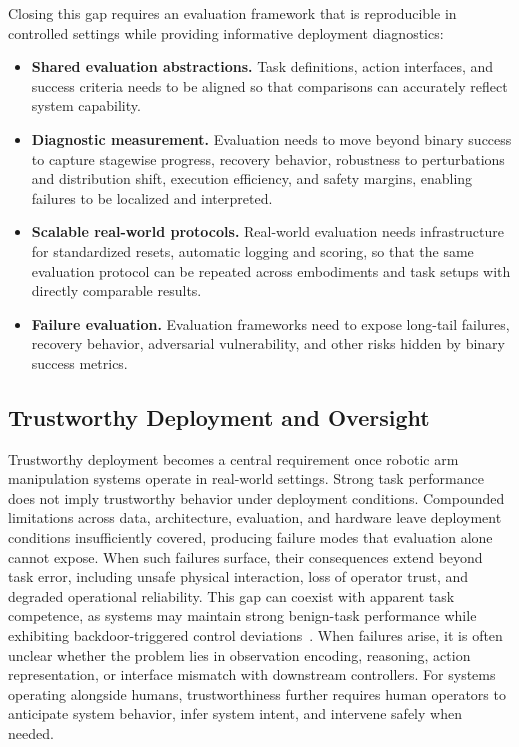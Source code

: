 \documentclass[acmsmall,screen,review]{acmart}
\begin{document}
Closing this gap requires an evaluation framework that is reproducible in controlled settings while providing informative deployment diagnostics:
\begin{itemize}
  \item \textbf{Shared evaluation abstractions.} Task definitions, action interfaces, and success criteria needs to be aligned so that comparisons can accurately reflect system capability.
  \item \textbf{Diagnostic measurement.} Evaluation needs to move beyond binary success to capture stagewise progress, recovery behavior, robustness to perturbations and distribution shift, execution efficiency, and safety margins, enabling failures to be localized and interpreted.
  \item \textbf{Scalable real-world protocols.} Real-world evaluation needs infrastructure for standardized resets, automatic logging and scoring, so that the same evaluation protocol can be repeated across embodiments and task setups with directly comparable results.
  \item \textbf{Failure evaluation.} Evaluation frameworks need to expose long-tail failures, recovery behavior, adversarial vulnerability, and other risks hidden by binary success metrics.
\end{itemize}

\subsection{Trustworthy Deployment and Oversight}\label{sec:challenge_safety}

Trustworthy deployment becomes a central requirement once robotic arm manipulation systems operate in real-world settings.
Strong task performance does not imply trustworthy behavior under deployment conditions.
Compounded limitations across data, architecture, evaluation, and hardware leave deployment conditions insufficiently covered, producing failure modes that evaluation alone cannot expose.
When such failures surface, their consequences extend beyond task error, including unsafe physical interaction, loss of operator trust, and degraded operational reliability.
This gap can coexist with apparent task competence, as systems may maintain strong benign-task performance while exhibiting backdoor-triggered control deviations~\cite{zhou2025badvla}.
When failures arise, it is often unclear whether the problem lies in observation encoding, reasoning, action representation, or interface mismatch with downstream controllers.
For systems operating alongside humans, trustworthiness further requires human operators to anticipate system behavior, infer system intent, and intervene safely when needed.
\end{document}
